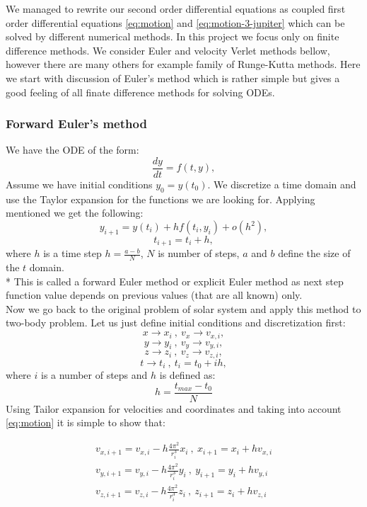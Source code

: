 \documentclass[10pt]{article}
\begin{document}
We managed to rewrite our second order differential equations as coupled first order differential equations \ref{eq:motion} and \ref{eq:motion-3-jupiter} which can be solved by different numerical methods. In this project we focus only on finite difference methods. We consider Euler and velocity Verlet methods bellow, however there are many others for example family of Runge-Kutta methods.
Here we start with discussion of Euler's method which is rather simple but gives a good feeling of all finate difference methods for solving ODEs.\\
\subsubsection{Forward Euler's method}

We have the ODE of the form: 
\[
\frac{dy}{dt}=f(t,y),
\] 
Assume we have initial conditions $y_0 = y(t_0)$. We discretize a time domain and use the Taylor expansion for the functions we are looking for. 
Applying mentioned we get the following:
\[ 
y_{i+1}=y(t_i)+hf(t_i,y_i)+o(h^2),
\]
\[
t_{i+1}=t_i+h,
\]
where $h$ is a time step $h=\frac{a-b}{N}$, $N$ is number of steps, $a$ and $b$ define the size of the $t$ domain.\\*
This is called a forward Euler method or explicit Euler method as next step function value depends on previous values (that are all known) only.\\
Now we go back to the original problem of solar system and apply this method to two-body problem. Let us just define initial conditions and discretization first:
\[
x \rightarrow x_i \ ,\ v_x \rightarrow v_{x,i},
\]
\[
y \rightarrow y_i \ ,\ v_y \rightarrow v_{y,i},
\]
\[
z \rightarrow z_i \ ,\ v_z \rightarrow v_{z,i},
\]
\[
t \rightarrow t_i \ ,\ t_i = t_0 + ih,
\]
where $i$ is a number of steps and $h$ is defined as:
\[
h = \frac{t_{max}-t_0}{N}
\]
Using Tailor expansion for velocities and coordinates and taking into account \ref{eq:motion} it is simple to show that: 

\begin{equation}\label{eq:euler-two-body}
\begin{aligned} 
v_{x,i+1}=v_{x,i}-h\frac{4\pi^2}{r_i^3}x_i \ ,\ x_{i+1}=x_{i}+hv_{x,i}\\
v_{y,i+1}=v_{y,i}-h\frac{4\pi^2}{r_i^3}y_i \ ,\ y_{i+1}=y_{i}+hv_{y,i}\\
v_{z,i+1}=v_{z,i}-h\frac{4\pi^2}{r_i^3}z_i \ ,\ z_{i+1}=z_{i}+hv_{z,i}\\
\end{aligned}
\end{equation}
\end{document}
